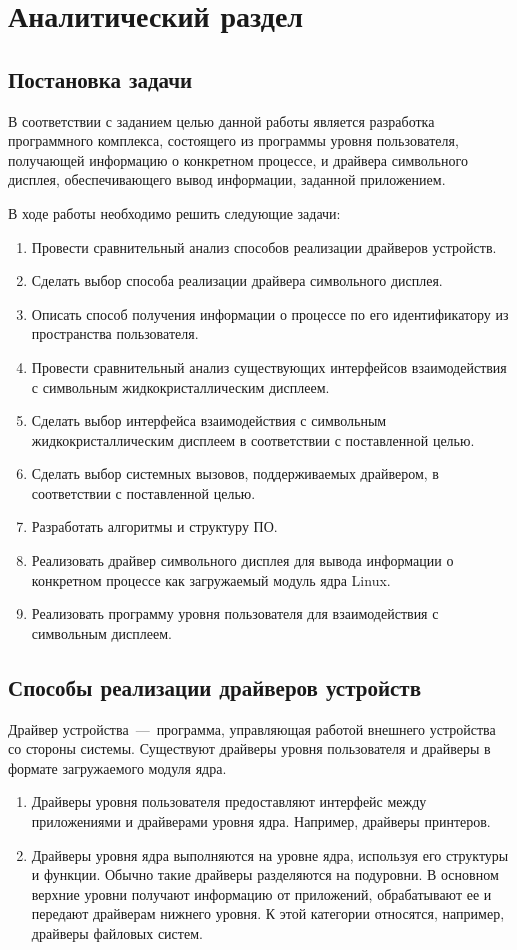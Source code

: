 \chapter{Аналитический раздел}

\section{Постановка задачи}
В соответствии с заданием целью данной работы является разработка программного комплекса, состоящего из программы уровня пользователя, получающей информацию о конкретном процессе, и драйвера символьного дисплея, обеспечивающего вывод информации, заданной приложением.

В ходе работы необходимо решить следующие задачи:
\begin{enumerate}
	\item Провести сравнительный анализ способов реализации драйверов устройств.
	\item Сделать выбор способа реализации драйвера символьного дисплея.
	\item Описать способ получения информации о процессе по его идентификатору из пространства пользователя.
	\item Провести сравнительный анализ существующих интерфейсов взаимодействия с символьным жидкокристаллическим дисплеем.
	\item Сделать выбор интерфейса взаимодействия с символьным жидкокристаллическим дисплеем в соответствии с поставленной целью.
	\item Сделать выбор системных вызовов, поддерживаемых драйвером, в соответствии с поставленной целью.
	\item Разработать алгоритмы и структуру ПО.
	\item Реализовать драйвер символьного дисплея для вывода информации о конкретном процессе как загружаемый модуль ядра Linux.
	\item Реализовать программу уровня пользователя для взаимодействия с символьным дисплеем.
\end{enumerate}

\section{Способы реализации драйверов устройств}
Драйвер устройства~---~программа, управляющая работой внешнего устройства со стороны системы. Существуют драйверы уровня пользователя и драйверы в формате загружаемого модуля ядра.
\begin{enumerate}
	\item Драйверы уровня пользователя предоставляют интерфейс между приложениями и драйверами уровня ядра. Например, драйверы принтеров.
	\item Драйверы уровня ядра выполняются на уровне ядра, используя его структуры и функции. Обычно такие драйверы разделяются на подуровни. В основном верхние уровни получают информацию от приложений, обрабатывают ее и передают драйверам нижнего уровня. К этой категории относятся, например, драйверы файловых систем. 
\end{enumerate}

